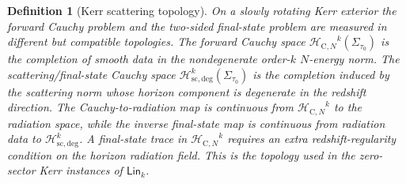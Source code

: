 \documentclass[10pt,a4paper]{amsart}
\newtheorem{definition}{Definition}
\newcommand{\Hcauchy}{\mathcal H_{\mathrm{C},N}}
\newcommand{\Hscatt}{\mathcal H_{\mathrm{sc,deg}}}
\newcommand{\Lin}{\mathsf{Lin}}
\begin{document}
\begin{definition}[Kerr scattering topology]\label{def:kerr-scattering-topology}
On a slowly rotating Kerr exterior the forward Cauchy problem and the two-sided final-state problem are measured in different but compatible topologies. The forward Cauchy space ${\Hcauchy}^{k}(\Sigma_{\tau_0})$ is the completion of smooth data in the nondegenerate order-$k$ $N$-energy norm. The scattering/final-state Cauchy space $\Hscatt^{k}(\Sigma_{\tau_0})$ is the completion induced by the scattering norm whose horizon component is degenerate in the redshift direction. The Cauchy-to-radiation map is continuous from ${\Hcauchy}^{k}$ to the radiation space, while the inverse final-state map is continuous from radiation data to $\Hscatt^{k}$. A final-state trace in ${\Hcauchy}^{k}$ requires an extra redshift-regularity condition on the horizon radiation field. This is the topology used in the zero-sector Kerr instances of $\Lin_k$.
\end{definition}
\end{document}
